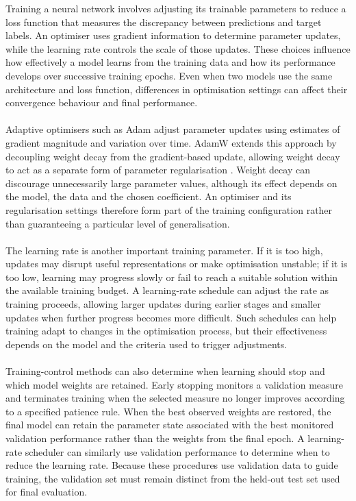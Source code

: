 \documentclass[12pt, a4paper]{report}
\begin{document}
				Training a neural network involves adjusting its trainable parameters to reduce a loss function that measures the discrepancy between predictions and target labels. An optimiser uses gradient information to determine parameter updates, while the learning rate controls the scale of those updates. These choices influence how effectively a model learns from the training data and how its performance develops over successive training epochs. Even when two models use the same architecture and loss function, differences in optimisation settings can affect their convergence behaviour and final performance.\\\\
				Adaptive optimisers such as Adam adjust parameter updates using estimates of gradient magnitude and variation over time. AdamW extends this approach by decoupling weight decay from the gradient-based update, allowing weight decay to act as a separate form of parameter regularisation \cite{loshchilov2019decoupled}. Weight decay can discourage unnecessarily large parameter values, although its effect depends on the model, the data and the chosen coefficient. An optimiser and its regularisation settings therefore form part of the training configuration rather than guaranteeing a particular level of generalisation.\\\\
				The learning rate is another important training parameter. If it is too high, updates may disrupt useful representations or make optimisation unstable; if it is too low, learning may progress slowly or fail to reach a suitable solution within the available training budget. A learning-rate schedule can adjust the rate as training proceeds, allowing larger updates during earlier stages and smaller updates when further progress becomes more difficult. Such schedules can help training adapt to changes in the optimisation process, but their effectiveness depends on the model and the criteria used to trigger adjustments.\\\\
				Training-control methods can also determine when learning should stop and which model weights are retained. Early stopping monitors a validation measure and terminates training when the selected measure no longer improves according to a specified patience rule. When the best observed weights are restored, the final model can retain the parameter state associated with the best monitored validation performance rather than the weights from the final epoch. A learning-rate scheduler can similarly use validation performance to determine when to reduce the learning rate. Because these procedures use validation data to guide training, the validation set must remain distinct from the held-out test set used for final evaluation.\\\\
\end{document}
